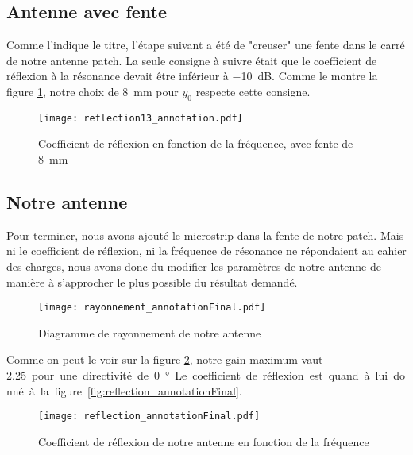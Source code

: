 \subsection{Antenne avec fente}
Comme l'indique le titre, l'étape suivant a été de "creuser" une fente dans le carré de notre antenne patch. La seule consigne à suivre était que le coefficient de réflexion à la résonance devait être inférieur à \SI{-10}{\deci\bel}. Comme le montre la figure \ref{fig:reflection13_annotation}, notre choix de \SI{8}{\milli\meter} pour $y_0$ respecte cette consigne.
\begin{figure}[htbp]
\centering
\texttt{[image: reflection13\_annotation.pdf]}
\caption{Coefficient de réflexion en fonction de la fréquence, avec fente de \SI{8}{\milli\meter}}
\label{fig:reflection13_annotation}
\end{figure}

\subsection{Notre antenne}
Pour terminer, nous avons ajouté le microstrip dans la fente de notre patch. Mais ni le coefficient de réflexion, ni la fréquence de résonance ne répondaient au cahier des charges, nous avons donc du modifier les paramètres de notre antenne de manière à s'approcher le plus possible du résultat demandé.
\begin{figure}[htbp]
\centering
\texttt{[image: rayonnement\_annotationFinal.pdf]}
\caption{Diagramme de rayonnement de notre antenne}
\label{fig:rayonnement_annotationFinal}
\end{figure}
Comme on peut le voir sur la figure \ref{fig:rayonnement_annotationFinal}, notre gain maximum vaut \SI{2.25} pour une directivité de \SI{0}{\degree}. Le coefficient de réflexion est quand à lui donné à la figure \ref{fig:reflection_annotationFinal}.
\begin{figure}[htbp]
\centering
\texttt{[image: reflection\_annotationFinal.pdf]}
\caption{Coefficient de réflexion de notre antenne en fonction de la fréquence}
\label{fig:reflection1_annotationFinal}
\end{figure}


